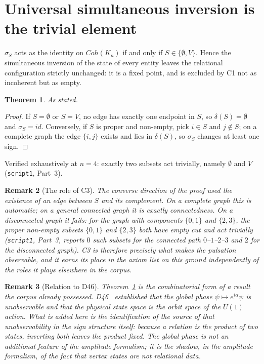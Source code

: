 \documentclass[11pt,a4paper]{article}
\def\mathrm#1{#1}%
\newtheorem{theorem}{Theorem}[section]
\newtheorem{remark}[theorem]{Remark}
\newcommand{\Kn}{K_n}
\newcommand{\Coh}{\mathrm{Coh}}
\begin{document}
\section{Universal simultaneous inversion is the trivial element}
\label{sec:trivial}

\begin{theorembox}
$\sigma_S$ acts as the identity on $\Coh(\Kn)$ if and only if $S\in\{\emptyset,V\}$. Hence the simultaneous inversion of the state of every entity leaves the relational configuration strictly unchanged: it is a fixed point, and is excluded by C1 not as incoherent but as empty.
\end{theorembox}

\begin{theorem}
\label{thm:trivial}
As stated.
\end{theorem}

\begin{proof}
If $S=\emptyset$ or $S=V$, no edge has exactly one endpoint in $S$, so $\delta(S)=\emptyset$ and $\sigma_S=\mathrm{id}$. Conversely, if $S$ is proper and non-empty, pick $i\in S$ and $j\notin S$; on a complete graph the edge $\{i,j\}$ exists and lies in $\delta(S)$, so $\sigma_S$ changes at least one sign.
\end{proof}

Verified exhaustively at $n=4$: exactly two subsets act trivially, namely $\emptyset$ and $V$ (\texttt{script1}, Part~3).

\begin{remark}[The role of C3]
\label{rem:C3}
The converse direction of the proof used the existence of an edge between $S$ and its complement. On a complete graph this is automatic; on a general connected graph it is exactly connectedness. On a disconnected graph it fails: for the graph with components $\{0,1\}$ and $\{2,3\}$, the proper non-empty subsets $\{0,1\}$ and $\{2,3\}$ both have empty cut and act trivially (\texttt{script1}, Part~3, reports $0$ such subsets for the connected path $0$--$1$--$2$--$3$ and $2$ for the disconnected graph). C3 is therefore precisely what makes the pulsation observable, and it earns its place in the axiom list on this ground independently of the roles it plays elsewhere in the corpus.
\end{remark}

\begin{remark}[Relation to D46]
\label{rem:D46}
Theorem~\ref{thm:trivial} is the combinatorial form of a result the corpus already possessed. D46~\citep{D46} established that the global phase $\psi\mapsto e^{i\alpha}\psi$ is unobservable and that the physical state space is the orbit space of the $\mathrm{U}(1)$ action. What is added here is the identification of the \emph{source} of that unobservability in the sign structure itself: because a relation is the product of two states, inverting both leaves the product fixed. The global phase is not an additional feature of the amplitude formalism; it is the shadow, in the amplitude formalism, of the fact that vertex states are not relational data.
\end{remark}
\end{document}
